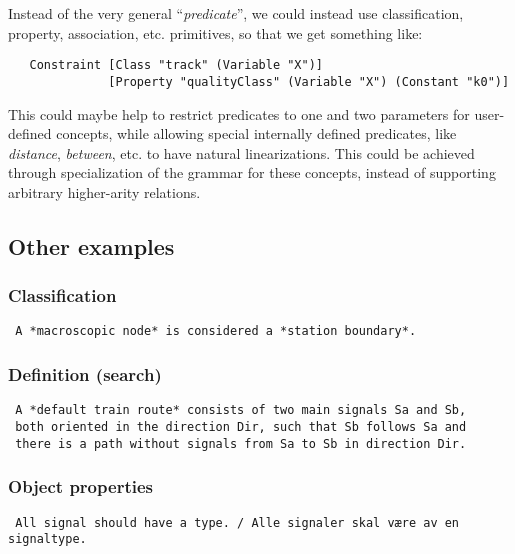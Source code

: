 \documentclass[]{article}
\begin{document}
Instead of the very general ``\emph{predicate}'', we could instead use
classification, property, association, etc. primitives, so that we get
something like:

\begin{verbatim}
   Constraint [Class "track" (Variable "X")] 
              [Property "qualityClass" (Variable "X") (Constant "k0")]
\end{verbatim}

This could maybe help to restrict predicates to one and two parameters
for user-defined concepts, while allowing special internally defined
predicates, like \emph{distance}, \emph{between}, etc. to have natural
linearizations. This could be achieved through specialization of the
grammar for these concepts, instead of supporting arbitrary higher-arity
relations.

\subsection{Other examples}\label{other-examples}

\subsubsection{Classification}\label{classification}

\begin{verbatim}
 A *macroscopic node* is considered a *station boundary*.
\end{verbatim}

\subsubsection{Definition (search)}\label{definition-search}

\begin{verbatim}
 A *default train route* consists of two main signals Sa and Sb, 
 both oriented in the direction Dir, such that Sb follows Sa and
 there is a path without signals from Sa to Sb in direction Dir.
\end{verbatim}

\subsubsection{Object properties}\label{object-properties}

\begin{verbatim}
 All signal should have a type. / Alle signaler skal være av en signaltype.
 
\end{verbatim}
\end{document}
